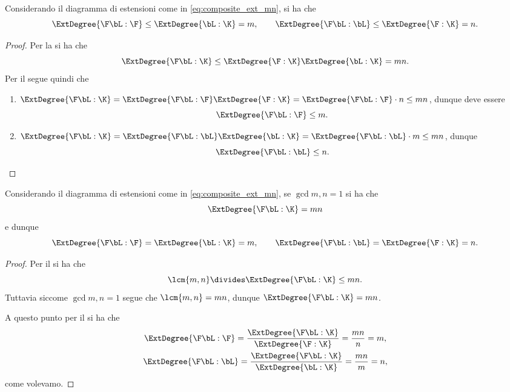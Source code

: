 \begin{corollary}
    {}{}
    Considerando il diagramma di estensioni come in \eqref{eq:composite_ext_mn}, si ha che \begin{equation}
        \ExtDegree{\F\bL : \F} \leq \ExtDegree{\bL : \K} = m, \qquad \ExtDegree{\F\bL : \bL} \leq \ExtDegree{\F : \K} = n.
    \end{equation}
\end{corollary}
\begin{proof}
    Per la  si ha che \[
        \ExtDegree{\F\bL : \K} \leq \ExtDegree{\F : \K}\ExtDegree{\bL : \K} = mn.
    \] Per il  segue quindi che \begin{enumerate}[(1)]
        \item $\ExtDegree{\F\bL : \K} = \ExtDegree{\F\bL : \F}\ExtDegree{\F : \K} = \ExtDegree{\F\bL : \F} \cdot n \leq mn$, dunque deve essere \[
            \ExtDegree{\F\bL : \F} \leq m.
        \]
        \item $\ExtDegree{\F\bL : \K} = \ExtDegree{\F\bL : \bL}\ExtDegree{\bL : \K} = \ExtDegree{\F\bL : \bL} \cdot m \leq mn$, dunque \[
            \ExtDegree{\F\bL : \bL} \leq n. \qedhere
        \]
    \end{enumerate}
\end{proof}

\begin{corollary}
    {}{}
    Considerando il diagramma di estensioni come in \eqref{eq:composite_ext_mn}, se $\gcd{m, n} = 1$ si ha che \begin{equation}
        \ExtDegree{\F\bL : \K} = mn
    \end{equation} e dunque \begin{equation}
        \ExtDegree{\F\bL : \F} = \ExtDegree{\bL : \K} = m, \qquad \ExtDegree{\F\bL : \bL} = \ExtDegree{\F : \K} = n.
    \end{equation}
\end{corollary}
\begin{proof}
    Per il  si ha che \[
        \lcm{m, n} \divides \ExtDegree{\F\bL : \K} \leq mn.
    \] Tuttavia siccome $\gcd{m, n} = 1$ segue che $\lcm{m, n} = mn$, dunque $\ExtDegree{\F\bL : \K} = mn$.
    
    A questo punto per il  si ha che \begin{gather*}
        \ExtDegree{\F\bL : \F} = \frac{\ExtDegree{\F\bL : \K}}{\ExtDegree{\F : \K}} = \frac{mn}{n} = m,\\
        \ExtDegree{\F\bL : \bL} = \frac{\ExtDegree{\F\bL : \K}}{\ExtDegree{\bL : \K}} = \frac{mn}{m} = n,
    \end{gather*}
    come volevamo.
\end{proof}


